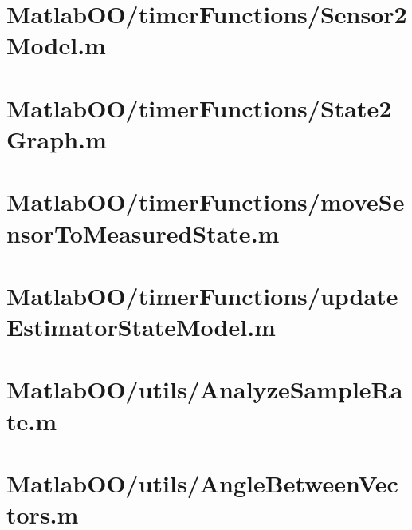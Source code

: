 \pagebreak
\section{MatlabOO/timerFunctions/Sensor2Model.m}\label{code:MatlabOO/timerFunctions/Sensor2Model.m}


\pagebreak
\section{MatlabOO/timerFunctions/State2Graph.m}\label{code:MatlabOO/timerFunctions/State2Graph.m}


\pagebreak
\section{MatlabOO/timerFunctions/moveSensorToMeasuredState.m}\label{code:MatlabOO/timerFunctions/moveSensorToMeasuredState.m}


\pagebreak
\section{MatlabOO/timerFunctions/updateEstimatorStateModel.m}\label{code:MatlabOO/timerFunctions/updateEstimatorStateModel.m}


\pagebreak
\section{MatlabOO/utils/AnalyzeSampleRate.m}\label{code:MatlabOO/utils/AnalyzeSampleRate.m}


\pagebreak
\section{MatlabOO/utils/AngleBetweenVectors.m}\label{code:MatlabOO/utils/AngleBetweenVectors.m}


